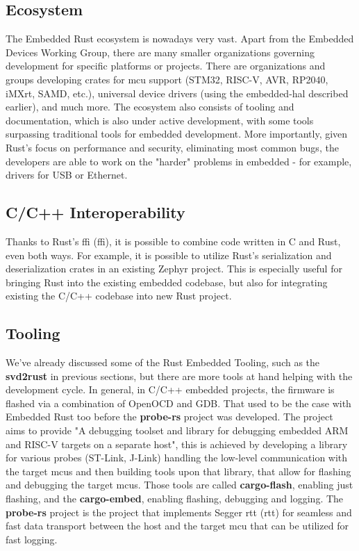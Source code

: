 \subsection{Ecosystem}
\label{subsec:ecosystem}
The Embedded Rust ecosystem is nowadays very vast.
Apart from the Embedded Devices Working Group, there are many smaller organizations governing development for specific platforms or projects.
There are organizations and groups developing crates for \acs{mcu} support (STM32, RISC-V, AVR, RP2040, iMXrt, SAMD, etc.), universal device drivers (using the embedded-hal described earlier), and much more.
The ecosystem also consists of tooling and documentation, which is also under active development, with some tools surpassing traditional tools for embedded development.
More importantly, given Rust's focus on performance and security, eliminating most common bugs, the developers are able to work on the "harder" problems in embedded - for example, drivers for USB\cite{noauthor_stm32-rsstm32-usbd_2021} or Ethernet\cite{noauthor_stm32-rsstm32-eth_2021}.

\subsection{C/C++ Interoperability}
\label{subsec:ccpp_interop}
Thanks to Rust's \acs{ffi} (\acl{ffi}), it is possible to combine code written in C and Rust, even both ways\cite{rust_embedded_devices_wg_interoperability_nodate}.
For example, it is possible to utilize Rust's serialization and deserialization crates in an existing Zephyr project\cite{wolff_embedding_nodate}.
This is especially useful for bringing Rust into the existing embedded codebase, but also for integrating existing the C/C++ codebase into new Rust project.

\subsection{Tooling}
\label{subsec:tooling}
We've already discussed some of the Rust Embedded Tooling, such as the \textbf{svd2rust} in previous sections, but there are more tools at hand helping with the development cycle.
In general, in C/C++ embedded projects, the firmware is flashed via a combination of OpenOCD and GDB.
That used to be the case with Embedded Rust too before the \textbf{probe-rs} project was developed.
The project aims to provide "A debugging toolset and library for debugging embedded ARM and RISC-V targets on a separate host"\cite{probe_rs_project_probe-rsprobe-rs_2021}, this is achieved by developing a library for various probes (ST-Link, J-Link) handling the low-level communication with the target \acs{mcu}s and then building tools upon that library, that allow for flashing and debugging the target \acs{mcu}s.
Those tools are called \textbf{cargo-flash}\cite{probe_rs_project_probe-rscargo-flash_2021}, enabling just flashing, and the \textbf{cargo-embed}\cite{probe_rs_project_probe-rscargo-embed_2021}, enabling flashing, debugging and logging.
The \textbf{probe-rs} project is the project that implements Segger \acs{rtt} (\acl{rtt}) for seamless and fast data transport between the host and the target \acs{mcu} that can be utilized for fast logging.


